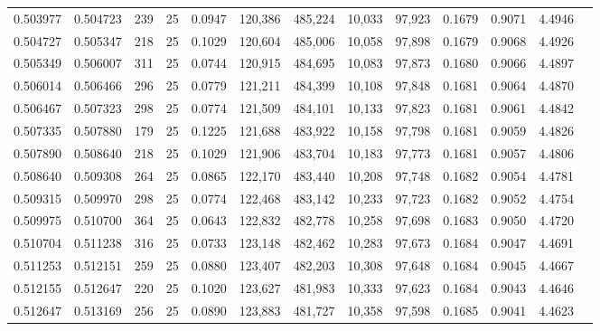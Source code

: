 \begin{tabular}{rrrrrrrrrrrrr}
0.503977 & 0.504723 &   239 &  25 &                                     0.0947 & 120,386 & 485,224 &  10,033 &  97,923 & 0.1679 & 0.9071 & 4.4946 \\
0.504727 & 0.505347 &   218 &  25 &                                     0.1029 & 120,604 & 485,006 &  10,058 &  97,898 & 0.1679 & 0.9068 & 4.4926 \\
0.505349 & 0.506007 &   311 &  25 &                                     0.0744 & 120,915 & 484,695 &  10,083 &  97,873 & 0.1680 & 0.9066 & 4.4897 \\
0.506014 & 0.506466 &   296 &  25 &                                     0.0779 & 121,211 & 484,399 &  10,108 &  97,848 & 0.1681 & 0.9064 & 4.4870 \\
0.506467 & 0.507323 &   298 &  25 &                                     0.0774 & 121,509 & 484,101 &  10,133 &  97,823 & 0.1681 & 0.9061 & 4.4842 \\
0.507335 & 0.507880 &   179 &  25 &                                     0.1225 & 121,688 & 483,922 &  10,158 &  97,798 & 0.1681 & 0.9059 & 4.4826 \\
0.507890 & 0.508640 &   218 &  25 &                                     0.1029 & 121,906 & 483,704 &  10,183 &  97,773 & 0.1681 & 0.9057 & 4.4806 \\
0.508640 & 0.509308 &   264 &  25 &                                     0.0865 & 122,170 & 483,440 &  10,208 &  97,748 & 0.1682 & 0.9054 & 4.4781 \\
0.509315 & 0.509970 &   298 &  25 &                                     0.0774 & 122,468 & 483,142 &  10,233 &  97,723 & 0.1682 & 0.9052 & 4.4754 \\
0.509975 & 0.510700 &   364 &  25 &                                     0.0643 & 122,832 & 482,778 &  10,258 &  97,698 & 0.1683 & 0.9050 & 4.4720 \\
0.510704 & 0.511238 &   316 &  25 &                                     0.0733 & 123,148 & 482,462 &  10,283 &  97,673 & 0.1684 & 0.9047 & 4.4691 \\
0.511253 & 0.512151 &   259 &  25 &                                     0.0880 & 123,407 & 482,203 &  10,308 &  97,648 & 0.1684 & 0.9045 & 4.4667 \\
0.512155 & 0.512647 &   220 &  25 &                                     0.1020 & 123,627 & 481,983 &  10,333 &  97,623 & 0.1684 & 0.9043 & 4.4646 \\
0.512647 & 0.513169 &   256 &  25 &                                     0.0890 & 123,883 & 481,727 &  10,358 &  97,598 & 0.1685 & 0.9041 & 4.4623 \\

\end{tabular}
